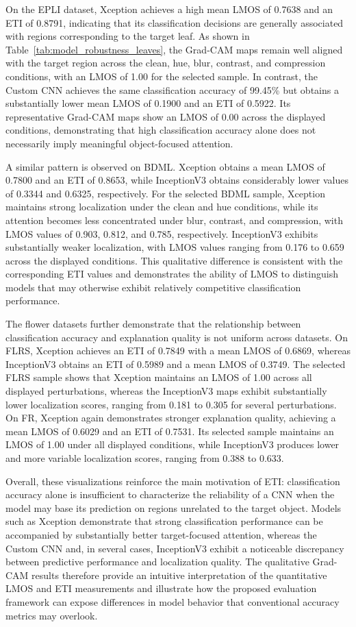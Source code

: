 \documentclass[a4paper,fleqn]{cas-dc}
\begin{document}
On the EPLI dataset, Xception achieves a high mean LMOS of 0.7638 and an ETI of 0.8791, indicating that its classification decisions are generally associated with regions corresponding to the target leaf. As shown in Table~\ref{tab:model_robustness_leaves}, the Grad-CAM maps remain well aligned with the target region across the clean, hue, blur, contrast, and compression conditions, with an LMOS of 1.00 for the selected sample. In contrast, the Custom CNN achieves the same classification accuracy of 99.45\% but obtains a substantially lower mean LMOS of 0.1900 and an ETI of 0.5922. Its representative Grad-CAM maps show an LMOS of 0.00 across the displayed conditions, demonstrating that high classification accuracy alone does not necessarily imply meaningful object-focused attention.

A similar pattern is observed on BDML. Xception obtains a mean LMOS of 0.7800 and an ETI of 0.8653, while InceptionV3 obtains considerably lower values of 0.3344 and 0.6325, respectively. For the selected BDML sample, Xception maintains strong localization under the clean and hue conditions, while its attention becomes less concentrated under blur, contrast, and compression, with LMOS values of 0.903, 0.812, and 0.785, respectively. InceptionV3 exhibits substantially weaker localization, with LMOS values ranging from 0.176 to 0.659 across the displayed conditions. This qualitative difference is consistent with the corresponding ETI values and demonstrates the ability of LMOS to distinguish models that may otherwise exhibit relatively competitive classification performance.

The flower datasets further demonstrate that the relationship between classification accuracy and explanation quality is not uniform across datasets. On FLRS, Xception achieves an ETI of 0.7849 with a mean LMOS of 0.6869, whereas InceptionV3 obtains an ETI of 0.5989 and a mean LMOS of 0.3749. The selected FLRS sample shows that Xception maintains an LMOS of 1.00 across all displayed perturbations, whereas the InceptionV3 maps exhibit substantially lower localization scores, ranging from 0.181 to 0.305 for several perturbations. On FR, Xception again demonstrates stronger explanation quality, achieving a mean LMOS of 0.6029 and an ETI of 0.7531. Its selected sample maintains an LMOS of 1.00 under all displayed conditions, while InceptionV3 produces lower and more variable localization scores, ranging from 0.388 to 0.633.

Overall, these visualizations reinforce the main motivation of ETI: classification accuracy alone is insufficient to characterize the reliability of a CNN when the model may base its prediction on regions unrelated to the target object. Models such as Xception demonstrate that strong classification performance can be accompanied by substantially better target-focused attention, whereas the Custom CNN and, in several cases, InceptionV3 exhibit a noticeable discrepancy between predictive performance and localization quality. The qualitative Grad-CAM results therefore provide an intuitive interpretation of the quantitative LMOS and ETI measurements and illustrate how the proposed evaluation framework can expose differences in model behavior that conventional accuracy metrics may overlook.
\end{document}
